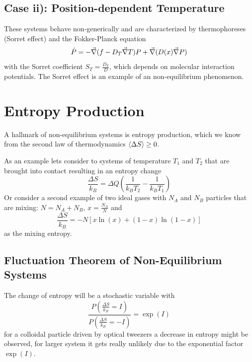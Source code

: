 \documentclass{notebook}
\begin{document}
\subsection*{Case ii): Position-dependent Temperature}

These systems behave non-generically and are characterized by thermophoreses (Sorret effect) and the Fokker-Planck equation
%
\begin{equation}
\dot{P} = - \vec{\nabla}(f -D_T \vec{\nabla} T)P + \vec{\nabla}(D(x)\vec{\nabla} P)
\end{equation}
%
with the Sorret coefficient $S_T = \frac{D_T}{D}$, which depends on molecular interaction potentials. The Sorret effect is an example of an non-equilibrium phenomenon. 

\section{Entropy Production}

A hallmark of non-equilibrium systems is entropy production, which we know from the second law of thermodynamics $\expval{\Delta S} \geq 0$.

As an example lets consider to systems of temperature $T_1$ and $T_2$ that are brought into contact resulting in an entropy change
%
\begin{equation}
	\frac{\Delta S}{k_B} = \Delta Q (\frac{1}{k_B T_2} - \frac{1}{k_B T_1})
\end{equation}
%
Or consider a second example of two ideal gases with $N_A$ and $N_B$ particles that are mixing: $N = N_A + N_B$, $x = \frac{N_A}{N}$ and 
%
\begin{equation}
	\frac{\Delta S}{k_B} = - N [x \ln(x) + (1-x)\ln(1-x)]
\end{equation}
%
as the mixing entropy.

\subsection*{Fluctuation Theorem of Non-Equilibrium Systems}

The change of entropy will be a stochastic variable with 
%
\begin{equation}
	\frac{P \left(\frac{\Delta S}{k_B} = I \right)}{P \left(\frac{\Delta S}{k_B} = -I \right)} = \exp(I)
\end{equation}
%
for a colloidal particle driven by optical tweezers a decrease in entropy might be observed, for larger system it gets really unlikely due to the exponential factor $\exp(I)$.
\end{document}
